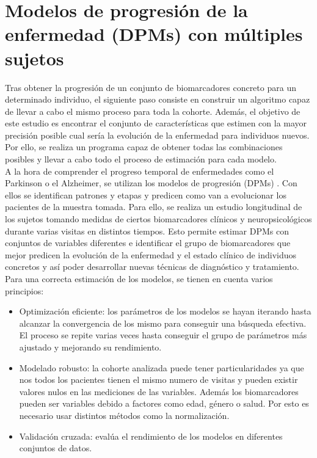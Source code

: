 \section{Modelos de progresión de la enfermedad (DPMs) con múltiples sujetos}
Tras obtener la progresión de un conjunto de biomarcadores concreto para un determinado individuo, el siguiente paso consiste en construir un algoritmo capaz de llevar a cabo el mismo proceso para toda la cohorte. Además, el objetivo de este estudio es encontrar el conjunto de características que estimen con la mayor precisión posible cual sería la evolución de la enfermedad para individuos nuevos. Por ello, se realiza un programa capaz de obtener todas las combinaciones posibles y llevar a cabo todo el proceso de estimación para cada modelo.\\



A la hora de comprender el progreso temporal de enfermedades como el Parkinson o el Alzheimer, se utilizan los modelos de progresión (DPMs) \cite{ghazi2021robust}. Con ellos se identifican patrones y etapas y predicen como van a evolucionar los pacientes de la muestra tomada. Para ello, se realiza un estudio longitudinal de los sujetos tomando medidas de ciertos biomarcadores clínicos y neuropsicológicos durante varias visitas en distintos tiempos. Esto permite estimar DPMs con conjuntos de variables diferentes e identificar el grupo de biomarcadores que mejor predicen la evolución de la enfermedad y el estado clínico de individuos concretos y así poder desarrollar nuevas técnicas de diagnóstico y tratamiento.\\

Para una correcta estimación de los modelos, se tienen en cuenta varios principios:
\begin{itemize}
	\item Optimización eficiente: los parámetros de los modelos se hayan iterando hasta alcanzar la convergencia de los mismo para conseguir una búsqueda efectiva. El proceso se repite varias veces hasta conseguir el grupo de parámetros más ajustado y mejorando su rendimiento.
	\item Modelado robusto: la cohorte analizada puede tener particularidades ya que nos todos los pacientes tienen el mismo numero de visitas y pueden existir valores nulos en las mediciones de las variables. Además los biomarcadores pueden ser variables debido a factores como edad, género o salud. Por esto es necesario usar distintos métodos como la normalización.
	\item Validación cruzada: evalúa el rendimiento de los modelos en diferentes conjuntos de datos.
\end{itemize} 

